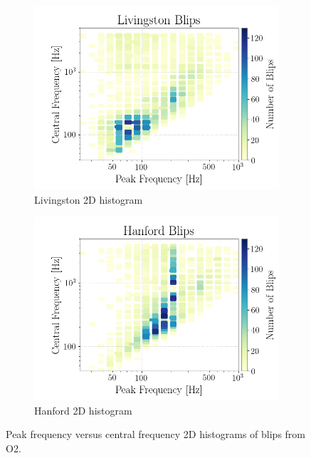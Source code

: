 \documentclass[a4paper]{article}
\begin{document}
\begin{figure}[h!]
	\centering
	\begin{subfigure}{.49\textwidth}
		\centering
		\includegraphics[width=1\linewidth]{llo_peak_v_centr}
		\caption{Livingston 2D histogram}
		\label{fig:llo_centr}
	\end{subfigure}
	\begin{subfigure}{.49\textwidth}
		\centering
		\includegraphics[width=1\linewidth]{lho_peak_v_centr}
		\caption{Hanford 2D histogram}
		\label{fig:lho_centr}
	\end{subfigure}
	\caption{Peak frequency versus central frequency 2D histograms of blips from O2.}
	\label{fig:central_hists}
\end{figure}
\end{document}
